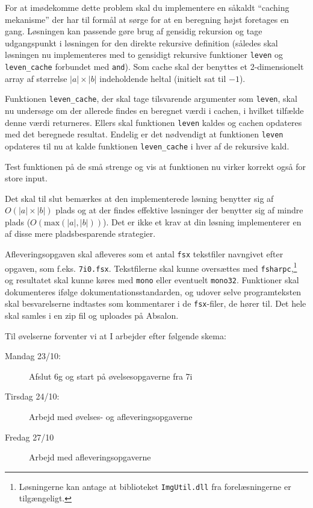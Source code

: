 \documentclass[a4paper,12pt]{article}
\begin{document}
\begin{enumerate}[label=7i.\arabic*,start=3]
    For at imødekomme dette problem skal du implementere en såkaldt
    ``caching mekanisme'' der har til formål at sørge for at en
    beregning højst foretages en gang.  Løsningen kan passende gøre
    brug af gensidig rekursion og tage udgangspunkt i løsningen for
    den direkte rekursive definition (således skal løsningen nu
    implementeres med to gensidigt rekursive funktioner \lstinline{leven} og \lstinline{leven_cache} forbundet med
    \lstinline{and}). Som cache skal der benyttes et 2-dimensionelt
    array af størrelse $|a|\times|b|$ indeholdende heltal (initielt
    sat til $-1$).

    Funktionen \lstinline{leven_cache}, der skal tage tilsvarende
    argumenter som \lstinline{leven}, skal nu undersøge om der
    allerede findes en beregnet værdi i cachen, i hvilket tilfælde
    denne værdi returneres. Ellers skal funktionen \lstinline{leven}
    kaldes og cachen opdateres med det beregnede resultat. Endelig er
    det nødvendigt at funktionen \lstinline{leven} opdateres til nu at
    kalde funktionen \lstinline{leven_cache} i hver af de rekursive kald.

    Test funktionen på de små strenge og vis at funktionen nu virker
    korrekt også for store input.

    Det skal til slut bemærkes at den implementerede løsning benytter
    sig af $O(|a| \times |b|)$ plads og at der findes effektive
    løsninger der benytter sig af mindre plads
    ($O(\mathrm{max}(|a|,|b|))$). Det er ikke et krav at din løsning
    implementerer en af disse mere pladsbesparende strategier.
\end{enumerate}

Afleveringsopgaven skal afleveres som et antal \texttt{fsx} tekstfiler
navngivet efter opgaven, som f.eks. \lstinline!7i0.fsx!. Tekstfilerne
skal kunne oversættes med \texttt{fsharpc},\footnote{Løsningerne kan
  antage at biblioteket \texttt{ImgUtil.dll} fra forelæsningerne er
  tilgængeligt.} og resultatet skal kunne køres med \texttt{mono}
eller eventuelt \texttt{mono32}. Funktioner skal dokumenteres ifølge
dokumentationsstandarden, og udover selve programteksten skal
besvarelserne indtastes som kommentarer i de \texttt{fsx}-filer, de
hører til. Det hele skal samles i en zip fil og uploades på Absalon.

Til øvelserne forventer vi at I arbejder efter følgende skema:
\begin{description}
\item[Mandag 23/10:] Afslut 6g og start på øvelsesopgaverne fra 7i
\item[Tirsdag 24/10:] Arbejd med øvelses- og afleveringsopgaverne
\item[Fredag 27/10] Arbejd med afleveringsopgaverne
\end{description}
\end{document}
